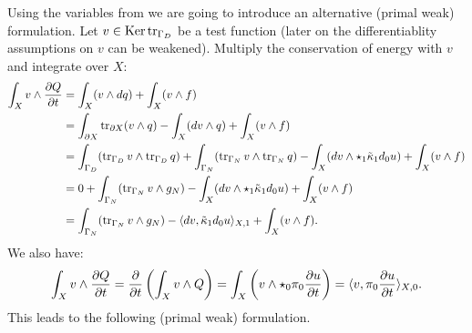 \begin{discussion}
  Using the variables from
  we are going to introduce an alternative (primal weak) formulation.
  Let $v \in \mathop{\rm Ker}\nolimits \mathop{\rm tr}\nolimits_{\Gamma_D}$ be a test function
  (later on the differentiablity assumptions on $v$ can be weakened).
  Multiply the conservation of energy with $v$ and integrate over $X$:
  \begin{equation}
    \begin{split}
      \int_X v \wedge \frac{\partial Q}{\partial t}
      & = \int_X (v \wedge d q) + \int_X (v \wedge f) \\
      & = \int_{\partial X} \mathop{\rm tr}\nolimits_{\partial X} (v \wedge q)
        - \int_X (d v \wedge q)
        + \int_X (v \wedge f) \\
      & = \int_{\Gamma_D} (\mathop{\rm tr}\nolimits_{\Gamma_D} v \wedge \mathop{\rm tr}\nolimits_{\Gamma_D} q)
        + \int_{\Gamma_N} (\mathop{\rm tr}\nolimits_{\Gamma_N} v \wedge \mathop{\rm tr}\nolimits_{\Gamma_N} q)
        - \int_X (d v \wedge \star_1 \tilde{\kappa}_1 d_0 u)
        + \int_X (v \wedge f) \\
      & = 0
        + \int_{\Gamma_N} (\mathop{\rm tr}\nolimits_{\Gamma_N} v \wedge g_N)
        - \int_X (d v \wedge \star_1 \tilde{\kappa}_1 d_0 u)
        + \int_X (v \wedge f) \\
      & = \int_{\Gamma_N} (\mathop{\rm tr}\nolimits_{\Gamma_N} v \wedge g_N)
        - \langle d v,\tilde{\kappa}_1 d_0 u\rangle_{X, 1}
        + \int_X (v \wedge f).
    \end{split}
  \end{equation}
  We also have:
  \begin{equation}
    \int_X v \wedge \frac{\partial Q}{\partial t}
    = \frac{\partial}{\partial t} \left(\int_X v \wedge Q\right)
    = \int_X \left(v \wedge \star_0 \pi_0 \frac{\partial u}{\partial t}\right)
    =  \langle v,\pi_0 \frac{\partial u}{\partial t}\rangle_{X, 0}.
  \end{equation}
  This leads to the following (primal weak) formulation.
\end{discussion}
